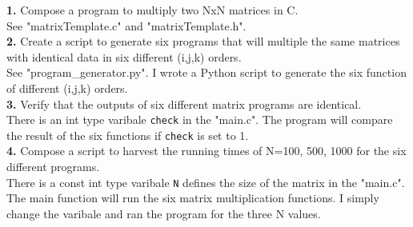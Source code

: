 \documentclass{article}
\begin{document}
\noindent\textbf{1.} Compose a program to multiply two NxN matrices in C.\\
\indent See "matrixTemplate.c" and "matrixTemplate.h".\\

\noindent\textbf{2.} Create a script to generate six programs that will multiple the same matrices with identical data in six different (i,j,k) orders.\\
\indent See "program\_generator.py". I wrote a Python script to generate the six function of different (i,j,k) orders.\\

\noindent\textbf{3.} Verify that the outputs of six different matrix programs are identical.\\
\indent There is an int type varibale \texttt{check} in the "main.c". The program will compare the result of the six functions if \texttt{check} is set to 1.\\

\noindent\textbf{4.} Compose a script to harvest the running times of N=100, 500, 1000 for the six different programs.\\
\indent There is a const int type varibale \texttt{N} defines the size of the matrix in the "main.c". The main function will run the six matrix multiplication functions. I simply change the varibale and ran the program for the three N values.\\
\end{document}
